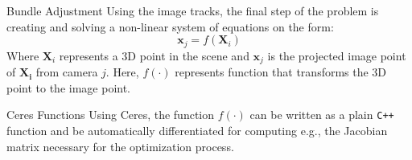 \documentclass[aspectratio=43]{beamer}
\begin{document}
\begin{frame}{Bundle Adjustment}
  Using the image tracks, the final step of the problem is creating and solving
  a non-linear system of equations on the form:
  \begin{equation*}
    \mathbf{x}_{j} = f(\mathbf{X}_{i})
  \end{equation*}
  Where $\mathbf{X}_{i}$ represents a 3D point in the scene and $\mathbf{x}_{j}$
  is the projected image point of $\mathbf{X_{i}}$ from camera $j$. Here,
  $f(\cdot)$ represents function that transforms the 3D point to the image point.
\end{frame}

\begin{frame}{Ceres Functions}
  Using Ceres, the function $f(\cdot)$ can be written as a plain \texttt{C++}
  function and be automatically differentiated for computing e.g., the Jacobian
  matrix necessary for the optimization process.

  

\end{frame}
\end{document}
